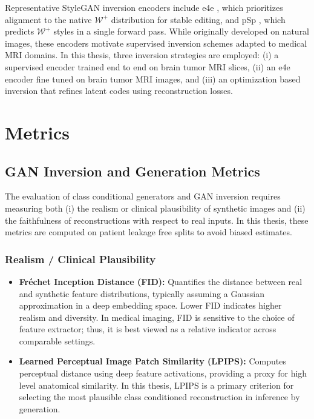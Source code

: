 Representative StyleGAN inversion encoders include e4e \cite{tov2021designingencoderstyleganimage}, which prioritizes alignment to the native $\mathcal{W}^+$ distribution for stable editing, and pSp \cite{richardson2021encoding}, which predicts $\mathcal{W}^+$ styles in a single forward pass. While originally developed on natural images, these encoders motivate supervised inversion schemes adapted to medical MRI domains. In this thesis, three inversion strategies are employed: (i) a supervised encoder trained end to end on brain tumor MRI slices, (ii) an e4e encoder fine tuned on brain tumor MRI images, and (iii) an optimization based inversion that refines latent codes using reconstruction losses.


\section{Metrics}

\subsection{GAN Inversion and Generation Metrics}

The evaluation of class conditional generators and GAN inversion requires measuring both (i) the realism or clinical plausibility of synthetic images and (ii) the faithfulness of reconstructions with respect to real inputs. In this thesis, these metrics are computed on patient leakage free splits to avoid biased estimates.

\subsubsection{Realism / Clinical Plausibility}

\begin{itemize}


    \item \textbf{Fréchet Inception Distance (FID):} Quantifies the distance between real and synthetic feature distributions, typically assuming a Gaussian approximation in a deep embedding space. Lower FID indicates higher realism and diversity. In medical imaging, FID is sensitive to the choice of feature extractor; thus, it is best viewed as a relative indicator across comparable settings.


    \item \textbf{Learned Perceptual Image Patch Similarity (LPIPS):} Computes perceptual distance using deep feature activations, providing a proxy for high level anatomical similarity. In this thesis, LPIPS is a primary criterion for selecting the most plausible class conditioned reconstruction in inference by generation.
\end{itemize}

